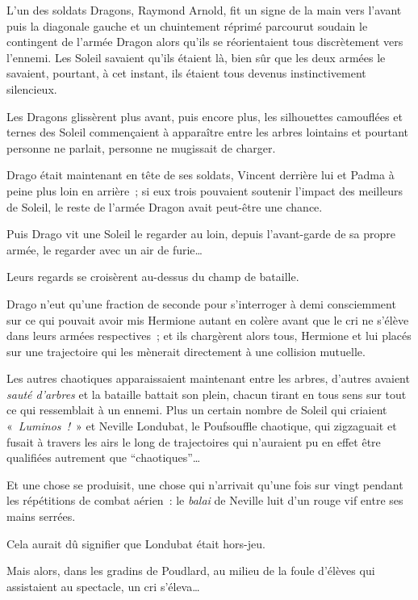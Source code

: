 \later

L'un des soldats Dragons, Raymond Arnold, fit un signe de la main vers l'avant puis la diagonale gauche et un chuintement réprimé parcourut soudain le contingent de l'armée Dragon alors qu'ils se réorientaient tous discrètement vers l'ennemi.
Les Soleil savaient qu'ils étaient là, bien sûr que les deux armées le savaient, pourtant, à cet instant, ils étaient tous devenus instinctivement silencieux.

Les Dragons glissèrent plus avant, puis encore plus, les silhouettes camouflées et ternes des Soleil commençaient à apparaître entre les arbres lointains et pourtant personne ne parlait, personne ne mugissait de charger.

Drago était maintenant en tête de ses soldats, Vincent derrière lui et Padma à peine plus loin en arrière~; si eux trois pouvaient soutenir l'impact des meilleurs de Soleil, le reste de l'armée Dragon avait peut-être une chance.

Puis Drago vit une Soleil le regarder au loin, depuis l'avant-garde de sa propre armée, le regarder avec un air de furie…

Leurs regards se croisèrent au-dessus du champ de bataille.

Drago n'eut qu'une fraction de seconde pour s'interroger à demi consciemment sur ce qui pouvait avoir mis Hermione autant en colère avant que le cri ne s'élève dans leurs armées respectives~; et ils chargèrent alors tous, Hermione et lui placés sur une trajectoire qui les mènerait directement à une collision mutuelle.

\later

Les autres chaotiques apparaissaient maintenant entre les arbres, d'autres avaient \emph{sauté d'arbres} et la bataille battait son plein, chacun tirant en tous sens sur tout ce qui ressemblait à un ennemi.
Plus un certain nombre de Soleil qui criaient «~\emph{Luminos~!}~» et Neville Londubat, le Poufsouffle chaotique, qui zigzaguait et fusait à travers les airs le long de trajectoires qui n'auraient pu en effet être qualifiées autrement que “chaotiques”…

Et une chose se produisit, une chose qui n'arrivait qu'une fois sur vingt pendant les répétitions de combat aérien~: le \emph{balai} de Neville luit d'un rouge vif entre ses mains serrées.

Cela aurait dû signifier que Londubat était hors-jeu.

Mais alors, dans les gradins de Poudlard, au milieu de la foule d'élèves qui assistaient au spectacle, un cri s'éleva…

